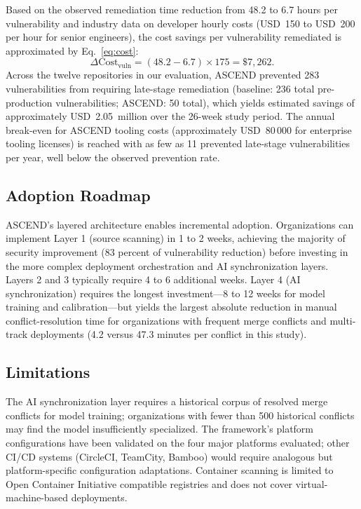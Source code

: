 \documentclass{ieeeaccess}
\begin{document}
Based on the observed remediation time reduction from 48.2 to 6.7 hours per vulnerability and industry data on developer hourly costs (USD~150 to USD~200 per hour for senior engineers), the cost savings per vulnerability remediated is approximated by Eq.~\eqref{eq:cost}:
\begin{equation}
\Delta\mathrm{Cost}_{\mathrm{vuln}} = (48.2 - 6.7) \times 175 = \$7{,}262.
\label{eq:cost}
\end{equation}
Across the twelve repositories in our evaluation, ASCEND prevented 283 vulnerabilities from requiring late-stage remediation (baseline: 236 total pre-production vulnerabilities; ASCEND: 50 total), which yields estimated savings of approximately USD~2.05~million over the 26-week study period. The annual break-even for ASCEND tooling costs (approximately USD~80\,000 for enterprise tooling licenses) is reached with as few as 11 prevented late-stage vulnerabilities per year, well below the observed prevention rate.

\subsection{Adoption Roadmap}
ASCEND's layered architecture enables incremental adoption. Organizations can implement Layer 1 (source scanning) in 1 to 2 weeks, achieving the majority of security improvement (83 percent of vulnerability reduction) before investing in the more complex deployment orchestration and AI synchronization layers. Layers 2 and 3 typically require 4 to 6 additional weeks. Layer 4 (AI synchronization) requires the longest investment---8 to 12 weeks for model training and calibration---but yields the largest absolute reduction in manual conflict-resolution time for organizations with frequent merge conflicts and multi-track deployments (4.2 versus 47.3 minutes per conflict in this study).

\subsection{Limitations}
The AI synchronization layer requires a historical corpus of resolved merge conflicts for model training; organizations with fewer than 500 historical conflicts may find the model insufficiently specialized. The framework's platform configurations have been validated on the four major platforms evaluated; other CI/CD systems (CircleCI, TeamCity, Bamboo) would require analogous but platform-specific configuration adaptations. Container scanning is limited to Open Container Initiative compatible registries and does not cover virtual-machine-based deployments.
\end{document}
